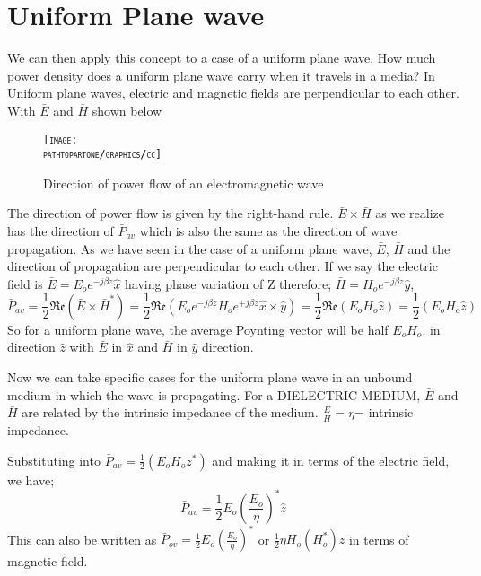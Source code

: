 \section{Uniform Plane wave}
We can then apply this concept to a case of a uniform plane wave. How much power density does a uniform plane wave carry when it travels in a media? In Uniform plane waves, electric and magnetic fields are perpendicular to each other. With $ \bar{E} $ and $ \bar{H} $ shown below
\begin{figure}[h]
\centering
\textsc{\texttt{[image: \\pathtopartone/graphics/cc]}}
\caption{Direction of power flow of an electromagnetic wave}
\end{figure}

The direction of power flow is given by the right-hand rule. $ \bar{E}\times\bar{H} $ as we realize has the direction of $ \bar{P}_{av} $ which is also the same as the direction of wave propagation. As we have seen in the case of a uniform plane wave, $ \bar{E} $, $ \bar{H} $ and the direction of propagation are perpendicular to each other. If we say the electric field is $ \bar{E}=E_{o}e^{-j\beta z}\hat{x} $ having phase variation of Z therefore;
$ \bar{H}=H_{o}e^{-j\beta z}\hat{y} $,
\begin{dmath*}
\bar{P}_{av}=\frac{1}{2}\mathfrak{Re}(\bar{E}\times\bar{H}^{*})
=\frac{1}{2}\mathfrak{Re}(E_{o}e^{-j\beta z}H_{o}e^{+j\beta z}\hat{x}\times\hat{y})
=\frac{1}{2}\mathfrak{Re}(E_{o}H_{o}\hat{z})=\frac{1}{2}(E_{o}H_{o}\hat{z}) 
\end{dmath*}
So for a uniform plane wave, the average Poynting vector will be half $ E_{o}H_{o} $. in direction $ \hat{z} $ with $ \bar{E} $ in $ \hat{x} $ and $ \bar{H} $ in $ \hat{y} $ direction.

Now we can take specific cases for the uniform plane wave in an unbound medium in which the wave is propagating. For a DIELECTRIC MEDIUM, $ \bar{E} $ and $ \bar{H} $ are related by the intrinsic impedance of the medium.
$ \frac{E}{H}=\eta $= intrinsic impedance.

Substituting into $ \bar{P}_{av}=\frac{1}{2}(E_{o}H_{o}z^{*}) $ and making it in terms of the electric field,  we have;
\begin{dmath*}
\bar{P}_{av}=\frac{1}{2}E_{o}(\frac{E_{o}}{\eta})^{*}\hat{z}  
\end{dmath*}
This can also be written as $ \bar{P}_{ov}=\frac{1}{2}E_{o}(\frac{E_{o}}{\eta})^{*} $ or  $ \frac{1}{2}\eta H_{o}(H_{o}^{*})\hat{z} $ in terms of magnetic field.

